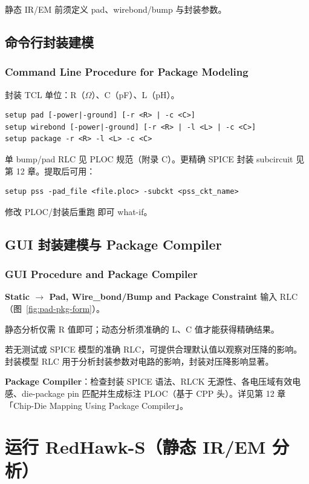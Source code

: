 静态 IR/EM 前须定义 pad、wirebond/bump 与封装参数。

\subsection{命令行封装建模}
\subsubsection*{Command Line Procedure for Package Modeling}

封装 TCL 单位：R（$\Omega$）、C（pF）、L（pH）。
\begin{lstlisting}
setup pad [-power|-ground] [-r <R> | -c <C>]
setup wirebond [-power|-ground] [-r <R> | -l <L> | -c <C>]
setup package -r <R> -l <L> -c <C>
\end{lstlisting}

单 bump/pad RLC 见 PLOC 规范（附录 C）。更精确 SPICE 封装 subcircuit 见第 12 章。提取后可用：
\begin{lstlisting}
setup pss -pad_file <file.ploc> -subckt <pss_ckt_name>
\end{lstlisting}
修改 PLOC/封装后重跑  即可 what-if。

\subsection{GUI 封装建模与 Package Compiler}
\subsubsection*{GUI Procedure and Package Compiler}

\textbf{Static $\rightarrow$ Pad, Wire\_bond/Bump and Package Constraint} 输入 RLC（图~\ref{fig:pad-pkg-form}）。

\begin{noteBox}
静态分析仅需 R 值即可；动态分析须准确的 L、C 值才能获得精确结果。
\end{noteBox}

若无测试或 SPICE 模型的准确 RLC，可提供合理默认值以观察对压降的影响。封装模型 RLC 用于分析封装参数对电路的影响，封装对压降影响显著。


\textbf{Package Compiler}：检查封装 SPICE 语法、RLCK 无源性、各电压域有效电感、die-package pin 匹配并生成标注 PLOC（基于 CPP 头）。详见第 12 章「Chip-Die Mapping Using Package Compiler」。

\section{运行 RedHawk-S（静态 IR/EM 分析）}
